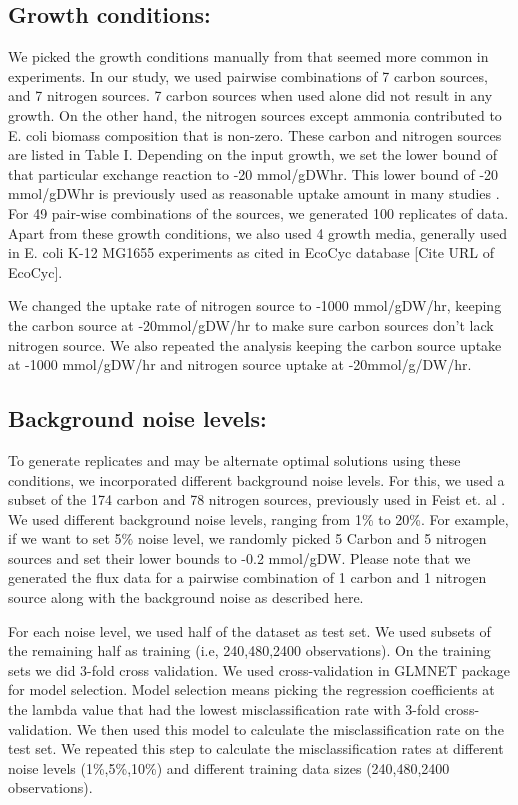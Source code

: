 \documentclass[12pt]{article}
\begin{document}
\subsection*{Growth conditions:} 
We picked the growth conditions manually from \cite{Feistetal2007} that seemed more common in experiments. In our study, we used pairwise combinations of 7 carbon sources, and 7 nitrogen sources. 7 carbon sources when used alone did not result in any growth. On the other hand, the nitrogen sources except ammonia contributed to E. coli biomass composition that is non-zero. These carbon and nitrogen sources are listed in Table I. Depending on the input growth, we set the lower bound of that particular exchange reaction to -20 mmol/gDWhr. This lower bound of -20 mmol/gDWhr is previously used as reasonable uptake amount in many studies \cite{Feistetal2007}. For 49 pair-wise combinations of the sources, we generated 100 replicates of data. Apart from these growth conditions, we also used 4 growth media, generally used in E. coli K-12 MG1655 experiments as cited in EcoCyc database [Cite URL of EcoCyc].

We changed the uptake rate of nitrogen source to -1000 mmol/gDW/hr, keeping the carbon source at -20mmol/gDW/hr to make sure carbon sources don't lack nitrogen source. We also repeated the analysis keeping the carbon source uptake at -1000 mmol/gDW/hr and nitrogen source uptake at -20mmol/g/DW/hr. 

\subsection*{Background noise levels:} 
To generate replicates and may be alternate optimal solutions using these conditions, we incorporated different background noise levels. For this, we used a subset of the 174 carbon and 78 nitrogen sources, previously used in Feist et. al \cite{Feistetal2007}.  We used different background noise levels, ranging from 1\% to 20\%. For example, if we want to set 5\% noise level, we randomly picked 5 Carbon and 5 nitrogen sources and set their lower bounds to -0.2 mmol/gDW. Please note that we generated the flux data for a pairwise combination of 1 carbon and 1 nitrogen source along with the background noise as described here. 

For each noise level, we used half of the dataset as test set. We used subsets of the remaining half as training (i.e, 240,480,2400 observations). On the training sets we did 3-fold cross validation. We used cross-validation in GLMNET package for model selection. Model selection means picking the regression coefficients at the lambda value that had the lowest misclassification rate with 3-fold cross-validation. We then used this model to calculate the misclassification rate on the test set. We repeated this step to calculate the misclassification rates at different noise levels (1\%,5\%,10\%) and different training data sizes (240,480,2400 observations).
\end{document}
